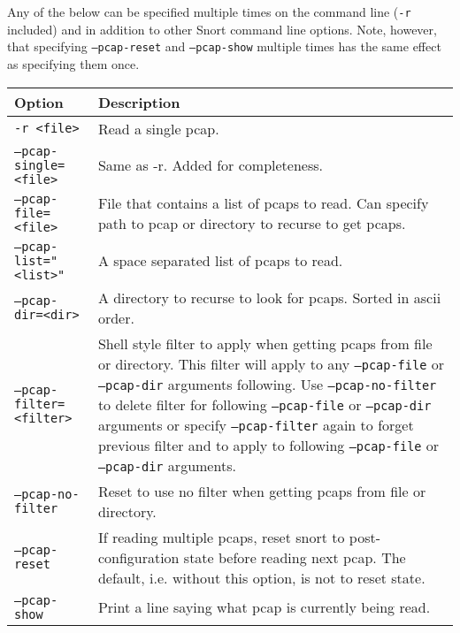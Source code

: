 \documentclass[english]{report}
\begin{document}
Any of the below can be specified multiple times on the command line
(\texttt{-r} included) and in addition to other Snort command line options.
Note, however, that specifying \texttt{--pcap-reset} and \texttt{--pcap-show}
multiple times has the same effect as specifying them once.

\begin{center}
\begin{tabular}{| l | p{4.5in} |}

\hline
\textbf{Option} & \textbf{Description}\\
\hline 

\hline 
\texttt{-r <file>} &

Read a single pcap. \\

\hline
\texttt{--pcap-single=<file>} &

Same as -r.  Added for completeness. \\

\hline
\texttt{--pcap-file=<file>} &

File that contains a list of pcaps to read.  Can specify path to pcap or
directory to recurse to get pcaps. \\

\hline
\texttt{--pcap-list="<list>"} &

A space separated list of pcaps to read. \\

\hline
\texttt{--pcap-dir=<dir>} &

A directory to recurse to look for pcaps.  Sorted in ascii order. \\

\hline
\texttt{--pcap-filter=<filter>} &

Shell style filter to apply when getting pcaps from file or directory.  This
filter will apply to any \texttt{--pcap-file} or \texttt{--pcap-dir} arguments
following.  Use \texttt{--pcap-no-filter} to delete filter for following
\texttt{--pcap-file} or \texttt{--pcap-dir} arguments or specify
\texttt{--pcap-filter} again to forget previous filter and to apply to
following \texttt{--pcap-file} or \texttt{--pcap-dir} arguments. \\

\hline
\texttt{--pcap-no-filter} &

Reset to use no filter when getting pcaps from file or directory. \\

\hline
\texttt{--pcap-reset} &

If reading multiple pcaps, reset snort to post-configuration state before
reading next pcap.  The default, i.e. without this option, is not to reset
state. \\

\hline
\texttt{--pcap-show} &

Print a line saying what pcap is currently being read. \\

\hline
\end{tabular}
\end{center}
\end{document}
